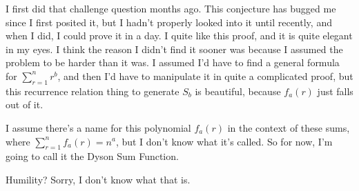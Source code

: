 \documentclass[a4paper]{article}
\newcommand{\sn}{\sum\limits_{r=1}^{n}}
\begin{document}
I first did that challenge question months ago. This conjecture has bugged me since I first posited it, but I hadn't properly looked into it until recently, and when I did, I could prove it in a day. I quite like this proof, and it is quite elegant in my eyes. I think the reason I didn't find it sooner was because I assumed the problem to be harder than it was. I assumed I'd have to find a general formula for $\sn r^b$, and then I'd have to manipulate it in quite a complicated proof, but this recurrence relation thing to generate $S_b$ is beautiful, because $f_a(r)$ just falls out of it.

I assume there's a name for this polynomial $f_a(r)$ in the context of these sums, where $\sn f_a(r) = n^a$, but I don't know what it's called. So for now, I'm going to call it the Dyson Sum Function.

Humility? Sorry, I don't know what that is.

\printbibliography
\end{document}
